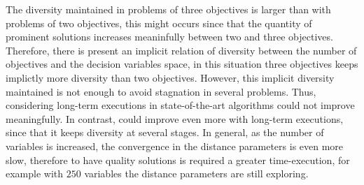 The diversity maintained in problems of three objectives is larger than with problems of two objectives, this might occurs since that the quantity of prominent solutions increases meaninfully between two and three objectives.
%
Therefore, there is present an implicit relation of diversity between the number of objectives and the decision variables space, in this situation three objectives keeps implictly more diversity than two objectives.
%
However, this implicit diversity maintained is not enough to avoid stagnation in several problems.
%
Thus, considering long-term executions in state-of-the-art algorithms could not improve meaningfully.
%
In contrast, \VSDMOEA{} could improve even more with long-term executions, since that it keeps diversity at several stages.
%
In general, as the number of variables is increased, the convergence in the distance parameters is even more slow, therefore to have quality solutions is required a greater time-execution, for example with $250$ variables the distance parameters are still exploring.
%

%
%
%
%
%
%
%
%
%
%


\begin{figure}[t]
\centering

\label{fig:Diversity_2obj}
\end{figure}


